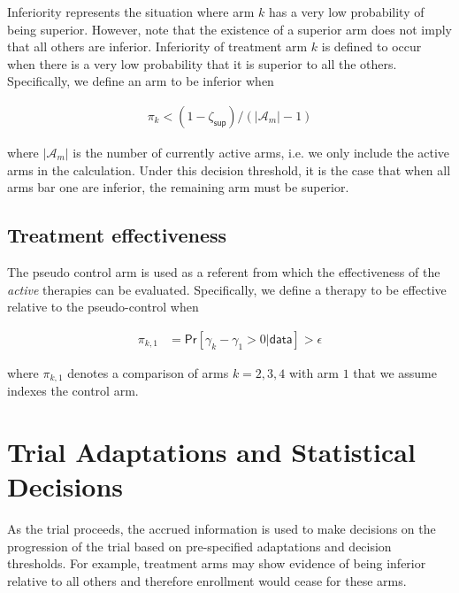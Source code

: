 \documentclass[
]{article}
\begin{document}
Inferiority represents the situation where arm $k$ has a very low probability of being superior.
However, note that the existence of a superior arm does not imply that all others are inferior.
Inferiority of treatment arm $k$ is defined to occur when there is a very low probability that it is superior to all the others.
Specifically, we define an arm to be inferior when

\[
  \begin{aligned}
    \pi_{k} < (1 - \zeta_{\mathsf{sup}}) / (|\mathcal{A}_m| - 1)
  \end{aligned}
\]

where $|\mathcal{A}_m|$ is the number of currently active arms, i.e. we only include the active arms in the calculation.
Under this decision threshold, it is the case that when all arms bar one are inferior, the remaining arm must be superior.

\hypertarget{treatment-effectiveness}{%
  \subsection{Treatment effectiveness}\label{treatment-effectiveness}}

The pseudo control arm is used as a referent from which the effectiveness of the \textit{active} therapies can be evaluated.
Specifically, we define a therapy to be effective relative to the pseudo-control when

\[
  \begin{aligned}
    \pi_{k,1} & = \mathsf{Pr}[\gamma_{k} - \gamma_{1} >0|\mathsf{data}] > \epsilon
  \end{aligned}
\]

where $\pi_{k,1}$ denotes a comparison of arms $k = 2, 3, 4$ with arm $1$ that we assume indexes the control arm.

\clearpage

\hypertarget{trial-adaptations-and-statistical-decisions}{%
  \section{Trial Adaptations and Statistical Decisions}\label{trial-adaptations-and-statistical-decisions}}

As the trial proceeds, the accrued information is used to make decisions on the progression of the trial based on pre-specified adaptations and decision thresholds.
For example, treatment arms may show evidence of being inferior relative to all others and therefore enrollment would cease for these arms.
\end{document}

